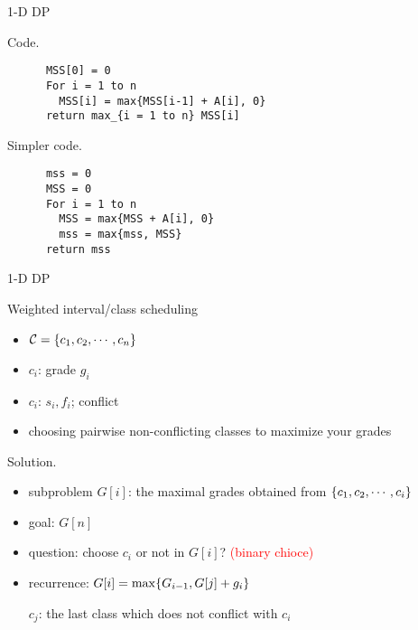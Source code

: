\begin{frame}[fragile]{1-D DP}
  \begin{block}{Code.}
    \begin{verbatim}
      MSS[0] = 0
      For i = 1 to n
        MSS[i] = max{MSS[i-1] + A[i], 0}
      return max_{i = 1 to n} MSS[i]
    \end{verbatim}
  \end{block}

  \begin{block}{Simpler code.}
    \begin{verbatim}
      mss = 0
      MSS = 0
      For i = 1 to n
        MSS = max{MSS + A[i], 0}
        mss = max{mss, MSS}
      return mss
    \end{verbatim}
  \end{block}
\end{frame}
\begin{frame}{1-D DP}
  \begin{exampleblock}{Weighted interval/class scheduling }
    \begin{itemize}
      \item $\mathcal{C} = \{c_{1}, c_{2}, \cdots, c_{n}\}$
      \item $c_{i}$: grade $g_{i}$
      \item $c_{i}$: $s_{i}, f_{i}$; conflict
      \item choosing pairwise non-conflicting classes to maximize your grades
    \end{itemize}
  \end{exampleblock}

  \begin{block}{Solution.}
    \begin{itemize}
      \item subproblem $G[i]$: the maximal grades obtained from $\{c_{1}, c_{2}, \cdots, c_{i}\}$
      \item goal: $G[n]$
      \item question: choose $c_{i}$ or not in $G[i]$? {\footnotesize \textcolor{red}{(binary chioce)}}
      \item recurrence: $G[i] = \max \{G_{i-1}, G[j] + g_{i}\}$ 
	
	$c_{j}$: the last class which does not conflict with $c_{i}$
    \end{itemize}
  \end{block}
\end{frame}
